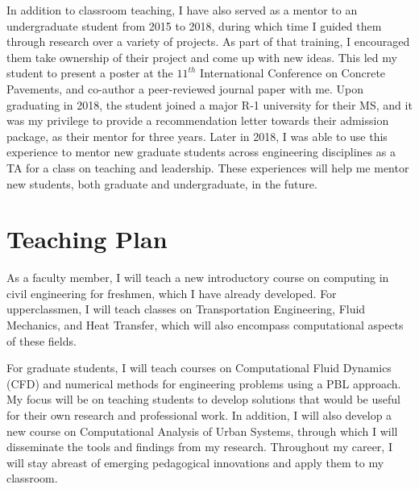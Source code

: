 \documentclass[12pt]{article}
\begin{document}
In addition to classroom teaching, I have also served as a mentor to an undergraduate student from 2015 to 2018, during which time I guided them through research over a variety of projects. As part of that training, I encouraged them take ownership of their project and come up with new ideas. This led my student to present a poster at the $11^{th}$ International Conference on Concrete Pavements, and co-author a peer-reviewed journal paper with me. Upon graduating in 2018, the student joined a major R-1 university for their MS, and it was my privilege to provide a recommendation letter towards their admission package, as their mentor for three years. Later in 2018, I was able to use this experience to mentor new graduate students across engineering disciplines as a TA for a class on teaching and leadership. These experiences will help me mentor new students, both graduate and undergraduate, in the future.

\section*{Teaching Plan}
As a faculty member, I will teach a new introductory course on computing in civil engineering for freshmen, which I have already developed. For upperclassmen, I will teach classes on Transportation Engineering, Fluid Mechanics, and Heat Transfer, which will also encompass computational aspects of these fields. 

For graduate students, I will teach courses on Computational Fluid Dynamics (CFD) and numerical methods for engineering problems using a PBL approach. My focus will be on teaching students to develop solutions that would be useful for their own research and professional work. In addition, I will also develop a new course on Computational Analysis of Urban Systems, through which I will disseminate the tools and findings from my research. Throughout my career, I will stay abreast of emerging pedagogical innovations and apply them to my classroom.
\end{document}
